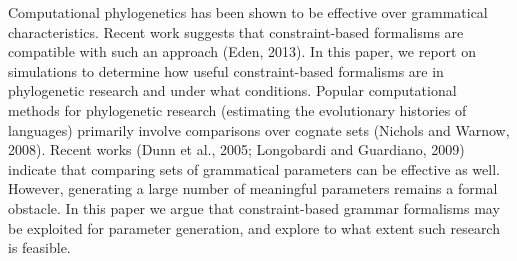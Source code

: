 Computational phylogenetics has been shown to be effective over grammatical characteristics. Recent work suggests that constraint-based formalisms are compatible with such an approach (Eden, 2013). In this paper, we report on simulations to determine how useful constraint-based formalisms are in phylogenetic research and under what conditions. Popular computational methods for phylogenetic research (estimating the evolutionary histories of languages) primarily involve comparisons over cognate sets (Nichols and Warnow, 2008).  Recent works (Dunn et al., 2005; Longobardi and Guardiano, 2009) indicate that comparing sets of grammatical parameters can be effective as well.  However, generating a large number of meaningful parameters remains a formal obstacle.  In this paper we argue that constraint-based grammar formalisms may be exploited for parameter generation, and explore to what extent such research is feasible.
